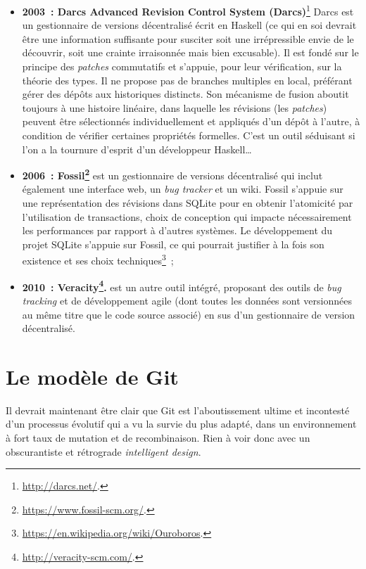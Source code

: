 \begin{itemize}
\item{\textbf{2003~: Darcs Advanced Revision Control System
      (Darcs)}\footnote{\url{http://darcs.net/}.}} Darcs
  est un gestionnaire de versions décentralisé écrit en Haskell (ce
  qui en soi devrait être une information suffisante pour susciter
  soit une irrépressible envie de le découvrir, soit une crainte
  irraisonnée mais bien excusable). Il est fondé sur le principe des
  \textit{patches} commutatifs et s'appuie, pour leur vérification,
  sur la théorie des types. Il ne propose pas de branches multiples en
  local, préférant gérer des dépôts aux historiques distincts. Son
  mécanisme de fusion aboutit toujours à une histoire linéaire, dans
  laquelle les révisions (les \textit{patches}) peuvent être
  sélectionnés individuellement et appliqués d'un dépôt à l'autre, à
  condition de vérifier certaines propriétés formelles. C'est un outil
  séduisant si l'on a la tournure d'esprit d'un développeur
  Haskell\ldots
\item \textbf{2006~:
    Fossil\footnote{\url{https://www.fossil-scm.org/}.}}
  est un gestionnaire de versions décentralisé qui inclut également
  une interface web, un \textit{bug tracker} et un wiki. Fossil
  s'appuie sur une représentation des révisions dans SQLite pour en
  obtenir l'atomicité par l'utilisation de transactions, choix de
  conception qui impacte nécessairement les performances par rapport à
  d'autres systèmes. Le développement du projet SQLite s'appuie sur
  Fossil, ce qui pourrait justifier à la fois son existence et ses
  choix
  techniques\footnote{\url{https://en.wikipedia.org/wiki/Ouroboros}.}~;
\item \textbf{2010~:
    Veracity\footnote{\url{http://veracity-scm.com/}.}.}
  est un autre outil intégré, proposant des outils de \textit{bug
    tracking} et de développement agile (dont toutes les données sont
  versionnées au même titre que le code source associé) en sus d'un
  gestionnaire de version décentralisé.
\end{itemize}

\section{Le modèle de Git} %

Il devrait maintenant être clair que Git est l'aboutissement ultime et
incontesté d'un processus évolutif qui a vu la survie du plus adapté,
dans un environnement à fort taux de mutation et de
recombinaison. Rien à voir donc avec un obscurantiste et rétrograde
\textit{intelligent design}.

